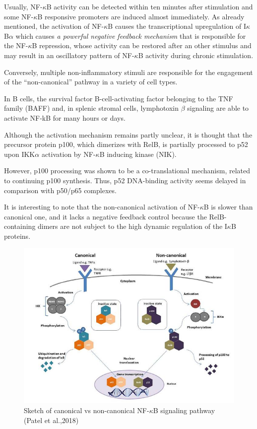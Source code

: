 \documentclass[12pt,a4paper]{report}
\begin{document}
Usually, NF-$\kappa$B activity can be detected within ten minutes after stimulation and some NF-$\kappa$B responsive promoters are induced almost immediately. As already mentioned, the activation of NF-$\kappa$B causes the transcriptional upregulation of I$\kappa$B$\alpha$ which causes \emph{a powerful negative feedback mechanism} that is responsible for the NF-$\kappa$B repression, whose activity can be restored after an other stimulus and may result in an oscillatory pattern of NF-$\kappa$B activity during chronic stimulation.

Conversely, multiple non-inflammatory stimuli are responsible for the engagement of the “non-canonical” pathway in a variety of cell types.

In B cells, the survival factor B-cell-activating factor belonging to the TNF family (BAFF) and, in splenic stromal cells, lymphotoxin $\beta$ signaling are able to activate NF-kB for many hours or days.

Although the activation mechanism remains partly unclear, it is thought that the precursor protein p100, which dimerizes with RelB, is partially processed to p52 upon IKK$\alpha$ activation by NF-$\kappa$B inducing kinase (NIK).

However, p100 processing was shown to be a co-translational mechanism, related to continuing p100 synthesis. Thus, p52 DNA-binding activity seems
delayed in comparison with p50/p65 complexes.

It is interesting to note that the non-canonical activation of NF-$\kappa$B is slower than canonical one, and it lacks a negative feedback control because the RelB-containing dimers are not subject to the high dynamic regulation of the I$\kappa$B proteins.

\begin{figure}[!ht]
\hspace*{-1cm} 
\includegraphics[scale=0.70]{canonicalvsnoncanonicalpathway.png}
\caption{Sketch of canonical vs non-canonical NF-$\kappa$B signaling pathway (Patel et al.,2018)}
\label{canonicalvsnoncanonicalpathway}
\end{figure}
\newpage
\end{document}
